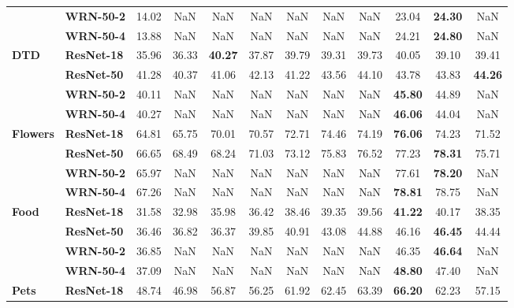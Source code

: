 \begin{table}
\begin{tabular}{l|l|cccccccccc}
       & \textbf{WRN-50-2} &             14.02 &   NaN &   NaN &   NaN &   NaN &   NaN &   NaN & 23.04 & \textbf{24.30} &   NaN \\
       & \textbf{WRN-50-4} &             13.88 &   NaN &   NaN &   NaN &   NaN &   NaN &   NaN & 24.21 & \textbf{24.80} &   NaN \\
\cline{1-12}
\multirow{4}{*}{\textbf{DTD}} & \textbf{ResNet-18} &             35.96 & 36.33 & \textbf{40.27} & 37.87 & 39.79 & 39.31 & 39.73 & 40.05 & 39.10 & 39.41 \\
       & \textbf{ResNet-50} &             41.28 & 40.37 & 41.06 & 42.13 & 41.22 & 43.56 & 44.10 & 43.78 & 43.83 & \textbf{44.26} \\
       & \textbf{WRN-50-2} &             40.11 &   NaN &   NaN &   NaN &   NaN &   NaN &   NaN & \textbf{45.80} & 44.89 &   NaN \\
       & \textbf{WRN-50-4} &             40.27 &   NaN &   NaN &   NaN &   NaN &   NaN &   NaN & \textbf{46.06} & 44.04 &   NaN \\
\cline{1-12}
\multirow{4}{*}{\textbf{Flowers}} & \textbf{ResNet-18} &             64.81 & 65.75 & 70.01 & 70.57 & 72.71 & 74.46 & 74.19 & \textbf{76.06} & 74.23 & 71.52 \\
       & \textbf{ResNet-50} &             66.65 & 68.49 & 68.24 & 71.03 & 73.12 & 75.83 & 76.52 & 77.23 & \textbf{78.31} & 75.71 \\
       & \textbf{WRN-50-2} &             65.97 &   NaN &   NaN &   NaN &   NaN &   NaN &   NaN & 77.61 & \textbf{78.20} &   NaN \\
       & \textbf{WRN-50-4} &             67.26 &   NaN &   NaN &   NaN &   NaN &   NaN &   NaN & \textbf{78.81} & 78.75 &   NaN \\
\cline{1-12}
\multirow{4}{*}{\textbf{Food}} & \textbf{ResNet-18} &             31.58 & 32.98 & 35.98 & 36.42 & 38.46 & 39.35 & 39.56 & \textbf{41.22} & 40.17 & 38.35 \\
       & \textbf{ResNet-50} &             36.46 & 36.82 & 36.37 & 39.85 & 40.91 & 43.08 & 44.88 & 46.16 & \textbf{46.45} & 44.44 \\
       & \textbf{WRN-50-2} &             36.85 &   NaN &   NaN &   NaN &   NaN &   NaN &   NaN & 46.35 & \textbf{46.64} &   NaN \\
       & \textbf{WRN-50-4} &             37.09 &   NaN &   NaN &   NaN &   NaN &   NaN &   NaN & \textbf{48.80} & 47.40 &   NaN \\
\cline{1-12}
\multirow{4}{*}{\textbf{Pets}} & \textbf{ResNet-18} &             48.74 & 46.98 & 56.87 & 56.25 & 61.92 & 62.45 & 63.39 & \textbf{66.20} & 62.23 & 57.15 \\

\end{tabular}
\end{table}
